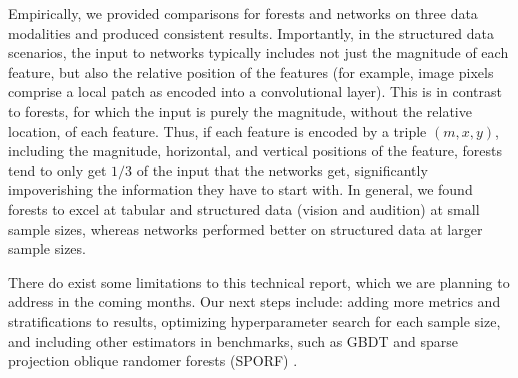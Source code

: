 Empirically, we provided comparisons for forests and networks on three data modalities and produced consistent results. Importantly, in the structured data scenarios, the input to networks typically includes not just the magnitude of each feature, but also the relative position of the features (for example, image pixels comprise a local patch as encoded into a convolutional layer). This is in contrast to forests, for which the input is purely the magnitude, without the relative location, of each feature. Thus, if each feature is encoded by a triple $(m,x,y)$, including the magnitude, horizontal, and vertical positions of the feature, forests tend to only get $1/3$ of the input that the networks get, significantly impoverishing the information they have to start with. In general, we found forests to excel at tabular and structured data (vision and audition) at small sample sizes, whereas networks performed better on structured data at larger sample sizes. 

There do exist some limitations to this technical report, which we are planning to address in the coming months. Our next steps include: adding more metrics and stratifications to results, optimizing hyperparameter search for each sample size, and including other estimators in benchmarks, such as GBDT and sparse projection oblique randomer forests (SPORF) \citep{sporf}.




